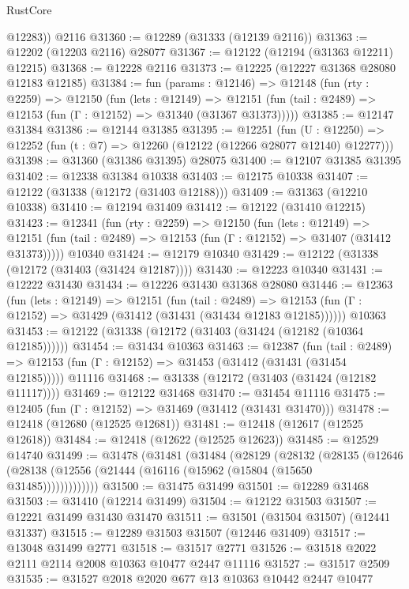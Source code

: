 \begin{lexlean}{RustCore}
\begin{coremodule}
        @12283))
    @2116
@31360 := @12289 (@31333 (@12139 @2116))
@31363 := @12202 (@12203 @2116) @28077
@31367 := @12122 (@12194 (@31363 @12211) @12215)
@31368 := @12228 @2116
@31373 := @12225 (@12227 @31368 @28080 @12183 @12185)
@31384 := fun (params : @12146) =>
  @12148
    (fun (rty : @2259) =>
    @12150
      (fun (lets : @12149) =>
      @12151 (fun (tail : @2489) => @12153 (fun (Γ : @12152) => @31340 (@31367 @31373)))))
@31385 := @12147 @31384
@31386 := @12144 @31385
@31395 := @12251
    (fun (U : @12250) => @12252 (fun (t : @7) => @12260 (@12122 (@12266 @28077 @12140) @12277)))
@31398 := @31360 (@31386 @31395) @28075
@31400 := @12107 @31385 @31395
@31402 := @12338 @31384 @10338
@31403 := @12175 @10338
@31407 := @12122 (@31338 (@12172 (@31403 @12188)))
@31409 := @31363 (@12210 @10338)
@31410 := @12194 @31409
@31412 := @12122 (@31410 @12215)
@31423 := @12341
    (fun (rty : @2259) =>
    @12150
      (fun (lets : @12149) =>
      @12151 (fun (tail : @2489) => @12153 (fun (Γ : @12152) => @31407 (@31412 @31373)))))
    @10340
@31424 := @12179 @10340
@31429 := @12122 (@31338 (@12172 (@31403 (@31424 @12187))))
@31430 := @12223 @10340
@31431 := @12222 @31430
@31434 := @12226 @31430 @31368 @28080
@31446 := @12363
    (fun (lets : @12149) =>
    @12151
      (fun (tail : @2489) =>
      @12153 (fun (Γ : @12152) => @31429 (@31412 (@31431 (@31434 @12183 @12185))))))
    @10363
@31453 := @12122 (@31338 (@12172 (@31403 (@31424 (@12182 (@10364 @12185))))))
@31454 := @31434 @10363
@31463 := @12387
    (fun (tail : @2489) => @12153 (fun (Γ : @12152) => @31453 (@31412 (@31431 (@31454 @12185)))))
    @11116
@31468 := @31338 (@12172 (@31403 (@31424 (@12182 @11117))))
@31469 := @12122 @31468
@31470 := @31454 @11116
@31475 := @12405 (fun (Γ : @12152) => @31469 (@31412 (@31431 @31470)))
@31478 := @12418 (@12680 (@12525 @12681))
@31481 := @12418 (@12617 (@12525 @12618))
@31484 := @12418 (@12622 (@12525 @12623))
@31485 := @12529 @14740
@31499 := @31478
    (@31481
      (@31484
        (@28129
          (@28132
            (@28135
              (@12646 (@28138 (@12556 (@21444 (@16116 (@15962 (@15804 (@15650 @31485)))))))))))))
@31500 := @31475 @31499
@31501 := @12289 @31468
@31503 := @31410 (@12214 @31499)
@31504 := @12122 @31503
@31507 := @12221 @31499 @31430 @31470
@31511 := @31501 (@31504 @31507) (@12441 @31337)
@31515 := @12289 @31503 @31507 (@12446 @31409)
@31517 := @13048 @31499 @2771
@31518 := @31517 @2771
@31526 := @31518 @2022 @2111 @2114 @2008 @10363 @10477 @2447 @11116
@31527 := @31517 @2509
@31535 := @31527 @2018 @2020 @677 @13 @10363 @10442 @2447 @10477

\end{coremodule}
\end{lexlean}
